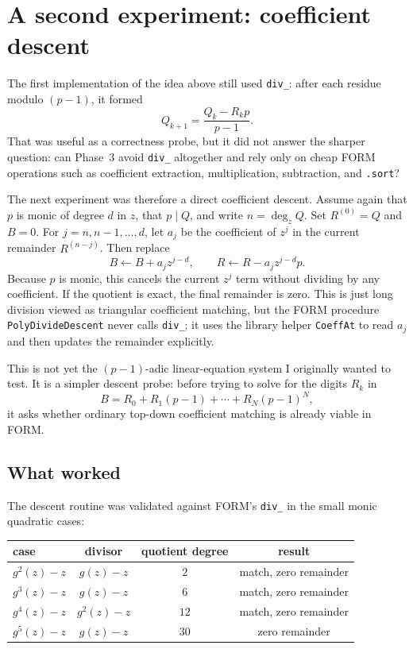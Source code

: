 \documentclass[11pt]{article}
\begin{document}
\section{A second experiment: coefficient descent}
\label{sec:descent}

The first implementation of the idea above still used \texttt{div\_}: after each
residue modulo $(p-1)$, it formed
\[
Q_{k+1}=\frac{Q_k-R_kp}{p-1}.
\]
That was useful as a correctness probe, but it did not answer the sharper question:
can Phase~3 avoid \texttt{div\_} altogether and rely only on cheap FORM operations
such as coefficient extraction, multiplication, subtraction, and \texttt{.sort}?

The next experiment was therefore a direct coefficient descent.  Assume again that
$p$ is monic of degree $d$ in $z$, that $p\mid Q$, and write $n=\deg_z Q$.  Set
$R^{(0)}=Q$ and $B=0$.  For $j=n,n-1,\ldots,d$, let $a_j$ be the coefficient of
$z^j$ in the current remainder $R^{(n-j)}$.  Then replace
\[
B \leftarrow B+a_j z^{j-d},
\qquad
R \leftarrow R-a_j z^{j-d}p.
\]
Because $p$ is monic, this cancels the current $z^j$ term without dividing by any
coefficient.  If the quotient is exact, the final remainder is zero.  This is just
long division viewed as triangular coefficient matching, but the FORM procedure
\texttt{PolyDivideDescent} never calls \texttt{div\_}; it uses the library helper
\texttt{CoeffAt} to read $a_j$ and then updates the remainder explicitly.

This is not yet the $(p-1)$-adic linear-equation system I originally wanted to test.
It is a simpler descent probe: before trying to solve for the digits $R_k$ in
\[
B=R_0+R_1(p-1)+\cdots+R_N(p-1)^N,
\]
it asks whether ordinary top-down coefficient matching is already viable in FORM.

\subsection{What worked}

The descent routine was validated against FORM's \texttt{div\_} in the small monic
quadratic cases:
\begin{center}
\renewcommand{\arraystretch}{1.2}
\begin{tabular}{lccc}
case & divisor & quotient degree & result \\\hline
$g^2(z)-z$ & $g(z)-z$ & $2$ & match, zero remainder \\
$g^3(z)-z$ & $g(z)-z$ & $6$ & match, zero remainder \\
$g^4(z)-z$ & $g^2(z)-z$ & $12$ & match, zero remainder \\
$g^5(z)-z$ & $g(z)-z$ & $30$ & zero remainder
\end{tabular}
\end{center}
\end{document}
